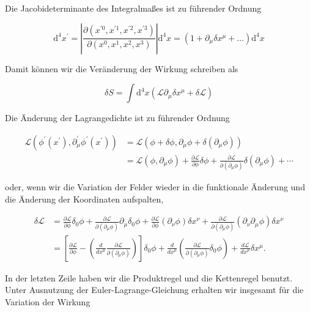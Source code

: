 \documentclass[10pt, letterpaper]{article}
\begin{document}
Die Jacobideterminante des Integralmaßes ist zu führender Ordnung

$$
\mathrm{d}^{4} x^{\prime}=\left|\frac{\partial\left(x^{\prime 0}, x^{\prime 1}, x^{\prime 2}, x^{\prime 3}\right)}{\partial\left(x^{0}, x^{1}, x^{2}, x^{3}\right)}\right| \mathrm{d}^{4} x=\left(1+\partial_{\mu} \delta x^{\mu}+\ldots\right) \mathrm{d}^{4} x
$$

Damit können wir die Veränderung der Wirkung schreiben als

$$
\delta S=\int \mathrm{d}^{4} x\left(\mathscr{L} \partial_{\mu} \delta x^{\mu}+\delta \mathscr{L}\right)
$$

Die Änderung der Lagrangedichte ist zu führender Ordnung

$$
\begin{aligned}
\mathscr{L}\left(\phi^{\prime}\left(x^{\prime}\right), \partial_{\mu}^{\prime} \phi^{\prime}\left(x^{\prime}\right)\right) & =\mathscr{L}\left(\phi+\delta \phi, \partial_{\mu} \phi+\delta\left(\partial_{\mu} \phi\right)\right) \\
& =\mathscr{L}\left(\phi, \partial_{\mu} \phi\right)+\frac{\partial \mathscr{L}}{\partial \phi} \delta \phi+\frac{\partial \mathscr{L}}{\partial\left(\partial_{\mu} \phi\right)} \delta\left(\partial_{\mu} \phi\right)+\cdots
\end{aligned}
$$

oder, wenn wir die Variation der Felder wieder in die funktionale Änderung und die Änderung der Koordinaten aufspalten,

$$
\begin{aligned}
\delta \mathscr{L} & =\frac{\partial \mathscr{L}}{\partial \phi} \delta_{0} \phi+\frac{\partial \mathscr{L}}{\partial\left(\partial_{\mu} \phi\right)} \partial_{\mu} \delta_{0} \phi+\frac{\partial \mathscr{L}}{\partial \phi}\left(\partial_{\nu} \phi\right) \delta x^{\nu}+\frac{\partial \mathscr{L}}{\partial\left(\partial_{\mu} \phi\right)}\left(\partial_{\nu} \partial_{\mu} \phi\right) \delta x^{\nu} \\
& =\left[\frac{\partial \mathscr{L}}{\partial \phi}-\left(\frac{d}{d x^{\mu}} \frac{\partial \mathscr{L}}{\partial\left(\partial_{\mu} \phi\right)}\right)\right] \delta_{0} \phi+\frac{d}{d x^{\mu}}\left(\frac{\partial \mathscr{L}}{\partial\left(\partial_{\mu} \phi\right)} \delta_{0} \phi\right)+\frac{d \mathscr{L}}{d x^{\mu}} \delta x^{\mu} .
\end{aligned}
$$

In der letzten Zeile haben wir die Produktregel und die Kettenregel benutzt. Unter Ausnutzung der Euler-Lagrange-Gleichung erhalten wir insgesamt für die Variation der Wirkung
\end{document}
